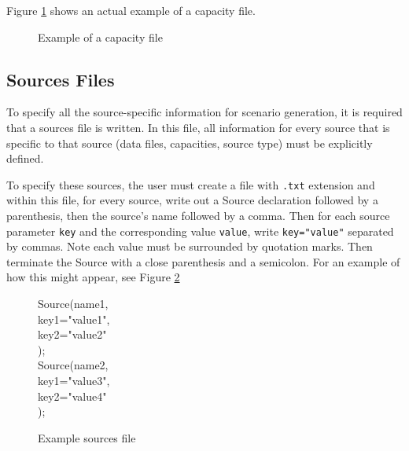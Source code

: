 \documentclass[11pt]{article}
\begin{document}
Figure \ref{fig:capacity} shows an actual example of a capacity file.

\begin{figure}[H]
	\begin{framed}
		
	\end{framed}
	\caption{Example of a capacity file}
	\label{fig:capacity}
\end{figure}

\subsection{Sources Files}
To specify all the source-specific information for scenario generation, it is required
that a sources file is written. In this file, all information for every source that is specific
to that source (data files, capacities, source type) must be explicitly defined.

To specify these sources, the user must create a file with \texttt{.txt} extension and within
this file, for every source, write out a Source declaration followed by a parenthesis, then the source's name followed by a comma. 
Then for each source parameter \texttt{key} and the corresponding value \texttt{value}, write \texttt{key="value"} separated by commas.
Note each value must be surrounded by quotation marks. Then terminate the Source with a close parenthesis and a semicolon.
For an example of how this might appear, see Figure \ref{fig:sources}

\begin{figure}[H]
	\begin{framed}
		Source(name1, \\
		key1="value1", \\
		key2="value2" \\
		);\\
		Source(name2,\\
		key1="value3", \\
		key2="value4"\\
		);
	\end{framed}
	\caption{Example sources file}
	\label{fig:sources}
\end{figure}
\end{document}
